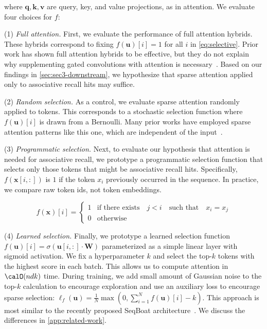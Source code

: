 {where $\bm{q}, \bm{k}, \bm{v}$ are query, key, and value projections, as in attention. We evaluate four choices for $f$:

(1) \textit{Full attention.} First, we evaluate the performance of full attention hybrids. These hybrids correspond to fixing $f(\bm{u})[i] = 1$ for all $i$ in \ref{eq:selective}. Prior work has shown full attention hybrids to be effective, but they do not explain why supplementing gated convolutions with attention is necessary~\citep{dao2022hungry}. Based on our findings in \ref{sec:sec3-downstream}, we hypothesize that sparse attention applied only to associative recall hits may suffice.

(2) \textit{Random selection.} As a control, we evaluate sparse attention randomly applied to tokens. This corresponds to a stochastic selection function where $f(\bm{u})[i]$ is drawn from a Bernoulli. Many prior works have employed sparse attention patterns like this one, which are independent of the input~\citep[inter alia.]{zaheer2020bigbird,child2019generating,beltagy2020longformer}.

(3) \textit{Programmatic selection.} Next, to evaluate our hypothesis that attention is needed for associative recall, we prototype a programmatic selection function that selects only those tokens that might be associative recall hits.  Specifically, $f(\bm{x}[i, :])$ is $1$ if the token $x_i$ previously occurred in the sequence. In practice, we compare raw token ids, not token embeddings.

\begin{equation}
    \label{eq:programmatic}
    f(\bm{x})[i] = 
    \begin{cases} 
        1 & \text{if there exists}  \quad j < i  \quad \text{such that} \quad x_i = x_j \\
        0 & \text{otherwise } 
    \end{cases}
\end{equation}

(4) \textit{Learned selection.} Finally, we prototype a learned selection function $f(\bm{u})[i] = \sigma(\bm{u}[i, :] \cdot \bm{W})$ parameterized as a simple linear layer with sigmoid activation. We fix a hyperparameter $k$ and select the top-$k$ tokens with the highest score in each batch. This allows us to compute attention in $\calO(ndk)$ time. During training, we add small amount of Gaussian noise to the top-$k$ calculation to encourage exploration and use an auxiliary loss to encourage sparse selection: $\ell_f(\mathbf{u}) = \frac{1}{N}\max(0, \sum_{i=1}^N f(\bm{u})[i] - k )$. This approach is most similar to the recently proposed SeqBoat architecture~\citep{ren2023sparse}. We discuss the differences in \ref{app:related-work}. 

}

